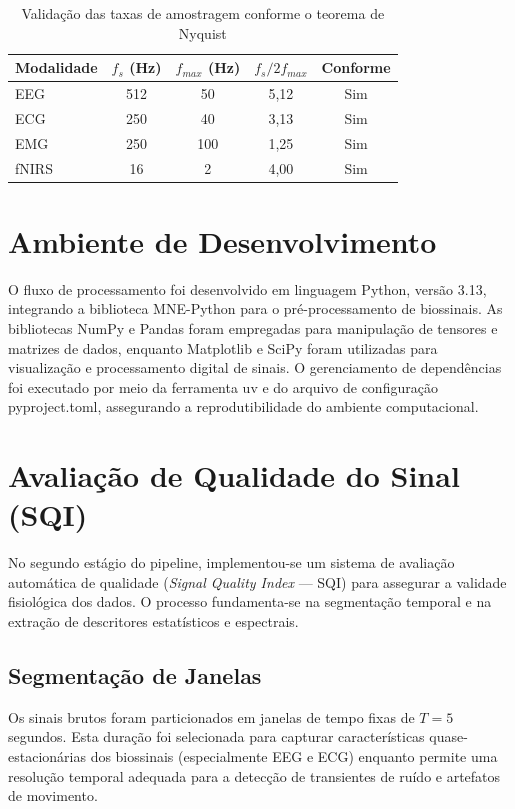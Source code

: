\begin{table}[htbp]
    \centering
    \caption{Validação das taxas de amostragem conforme o teorema de Nyquist}
    \label{tab:nyquist_validacao}
    \begin{tabular}{lcccc}
        \toprule
        \textbf{Modalidade} & $f_s$ (Hz) & $f_{max}$ (Hz) & $f_s / 2f_{max}$ & \textbf{Conforme} \\
        \midrule
        EEG & 512 & 50 & 5,12 & Sim \\
        ECG & 250 & 40 & 3,13 & Sim \\
        EMG & 250 & 100 & 1,25 & Sim \\
        fNIRS & 16 & 2 & 4,00 & Sim \\
        \bottomrule
    \end{tabular}
\end{table}

\section{Ambiente de Desenvolvimento}

O fluxo de processamento foi desenvolvido em linguagem Python, versão 3.13, integrando a biblioteca MNE-Python para o pré-processamento de biossinais. As bibliotecas NumPy e Pandas foram empregadas para manipulação de tensores e matrizes de dados, enquanto Matplotlib e SciPy foram utilizadas para visualização e processamento digital de sinais. O gerenciamento de dependências foi executado por meio da ferramenta uv e do arquivo de configuração pyproject.toml, assegurando a reprodutibilidade do ambiente computacional.

\section{Avaliação de Qualidade do Sinal (SQI)}
\label{sec:metodo_sqi}

No segundo estágio do pipeline, implementou-se um sistema de avaliação automática de qualidade (\textit{Signal Quality Index} --- SQI) para assegurar a validade fisiológica dos dados. O processo fundamenta-se na segmentação temporal e na extração de descritores estatísticos e espectrais.

\subsection{Segmentação de Janelas}
Os sinais brutos foram particionados em janelas de tempo fixas de $T = 5$ segundos. Esta duração foi selecionada para capturar características quase-estacionárias dos biossinais (especialmente EEG e ECG) enquanto permite uma resolução temporal adequada para a detecção de transientes de ruído e artefatos de movimento.

